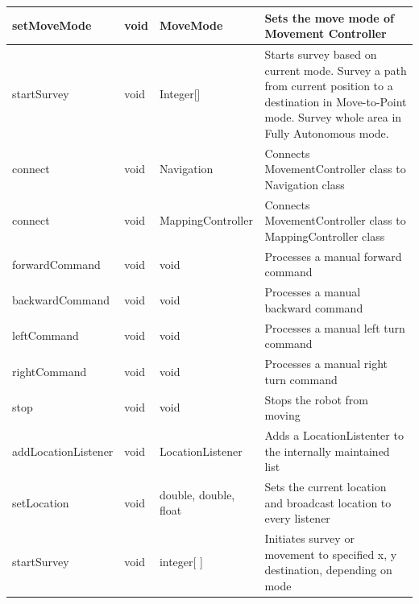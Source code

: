 \documentclass[12pt]{article}
\begin{document}
\tablelasttail{\hline}
\label{table:movementcontroller}
\begin{supertabular}
{ | p{0.27\textwidth} | p{0.25\textwidth} |p{0.25\textwidth}|p{0.28\textwidth}|}
\hline
setMoveMode & void & MoveMode & Sets the move mode of Movement Controller \\
\hline
startSurvey & void & Integer[] & Starts survey based on current mode. Survey a path from current position to a destination in Move-to-Point mode. Survey whole area in Fully Autonomous mode. \\
\hline
connect & void & Navigation & Connects MovementController class to Navigation class \\
\hline
connect & void & MappingController & Connects MovementController class to MappingController class \\
\hline
forwardCommand & void & void & Processes a manual forward command \\
\hline
backwardCommand & void & void & Processes a manual backward command \\
\hline
leftCommand & void & void & Processes a manual left turn command \\
\hline
rightCommand & void & void & Processes a manual right turn command \\
\hline
stop & void & void & Stops the robot from moving\\
\hline
addLocationListener & void & LocationListener & Adds a LocationListenter to the internally maintained list \\
\hline
setLocation & void & double, double, float & Sets the current location and broadcast location to every listener\\
\hline
startSurvey & void & integer[ ] & Initiates survey or movement to specified x, y destination, depending on mode \\
\hline
\end{supertabular}
\end{document}

